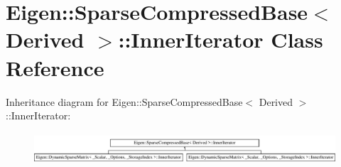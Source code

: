 \hypertarget{class_eigen_1_1_sparse_compressed_base_1_1_inner_iterator}{}\section{Eigen\+:\+:Sparse\+Compressed\+Base$<$ Derived $>$\+:\+:Inner\+Iterator Class Reference}
\label{class_eigen_1_1_sparse_compressed_base_1_1_inner_iterator}
Inheritance diagram for Eigen\+:\+:Sparse\+Compressed\+Base$<$ Derived $>$\+:\+:Inner\+Iterator\+:\begin{figure}[H]
\begin{center}
\leavevmode
\includegraphics[height=1.181435cm]{class_eigen_1_1_sparse_compressed_base_1_1_inner_iterator}
\end{center}
\end{figure}
